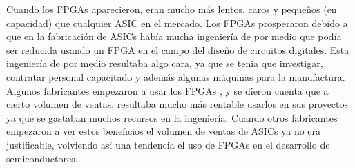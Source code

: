 \documentclass[twoside,spanish,ESP,MSc]{plantillaLabUPV}
\theoremstyle{definition}
\newcommand{\f}{FPGA }
\newcommand{\fs}{FPGAs }
\begin{document}


Cuando los \fs aparecieron, eran mucho más lentos, caros y pequeños (en capacidad) que cualquier ASIC en el mercado. Los \fs prosperaron debido a que en la fabricación de ASICs había mucha ingeniería de por medio que podía ser reducida usando un FPGA en el campo del diseño de circuitos digitales. Esta ingeniería de por medio resultaba algo cara, ya que se tenia que investigar, contratar personal capacitado y además algunas máquinas para la manufactura. Algunos fabricantes empezaron a usar los \fs, y se dieron cuenta que a cierto volumen de ventas, resultaba mucho más rentable usarlos en sus proyectos ya que se gastaban muchos recursos en la ingeniería. Cuando otros fabricantes empezaron a ver estos beneficios el volumen de ventas de ASICs ya no era justificable, volviendo así una tendencia el uso de FPGAs en el desarrollo de semiconductores.


\end{document}
